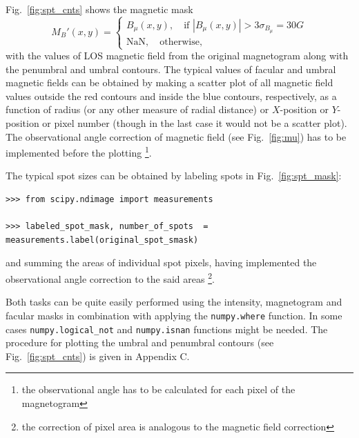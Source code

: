 \documentclass[paper=a4, fontsize=11pt]{article}
\numberwithin{equation}{section}
\numberwithin{figure}{section}
\numberwithin{table}{section}
\begin{document}
Fig.~\ref{fig:spt_cnts} shows the magnetic mask
\begin{equation}\label{eq:mag_mask_prime}
M_B'(x, y) =
\begin{cases}
B_\mu(x, y),\quad \text{if } |B_\mu(x, y)| > 3\sigma_{B_\mu} = 30G\\
\mathrm{NaN},\quad \text{otherwise},
\end{cases}
\end{equation}
with the values of LOS magnetic field from the original magnetogram along with the penumbral and umbral contours.
The typical values of facular and umbral magnetic fields can be obtained by making a scatter plot of all magnetic
field values outside the red contours and inside the blue contours, respectively, as a function of radius
(or any other measure of radial distance) or $X$-position or $Y$-position or pixel number
(though in the last case it would not be a scatter plot).
The observational angle correction of magnetic field (see Fig.~\ref{fig:mu}) has to be implemented before the plotting
\footnote{the observational angle has to be calculated for each pixel of the magnetogram}.

The typical spot sizes can be obtained by labeling spots in Fig.~\ref{fig:spt_mask}:
\begin{verbatim}
>>> from scipy.ndimage import measurements

>>> labeled_spot_mask, number_of_spots  = measurements.label(original_spot_smask)
\end{verbatim}
and summing the areas of individual spot pixels, having implemented the observational angle correction to the said areas
\footnote{the correction of pixel area is analogous to the magnetic field correction}.

Both tasks can be quite easily performed using the intensity, magnetogram and facular masks in
combination with applying the \texttt{numpy.where} function.
In some cases \texttt{numpy.logical\_not} and \texttt{numpy.isnan} functions might be needed.
The procedure for plotting the umbral and penumbral contours (see Fig.~\ref{fig:spt_cnts}) is given in Appendix C.

\clearpage
\end{document}
